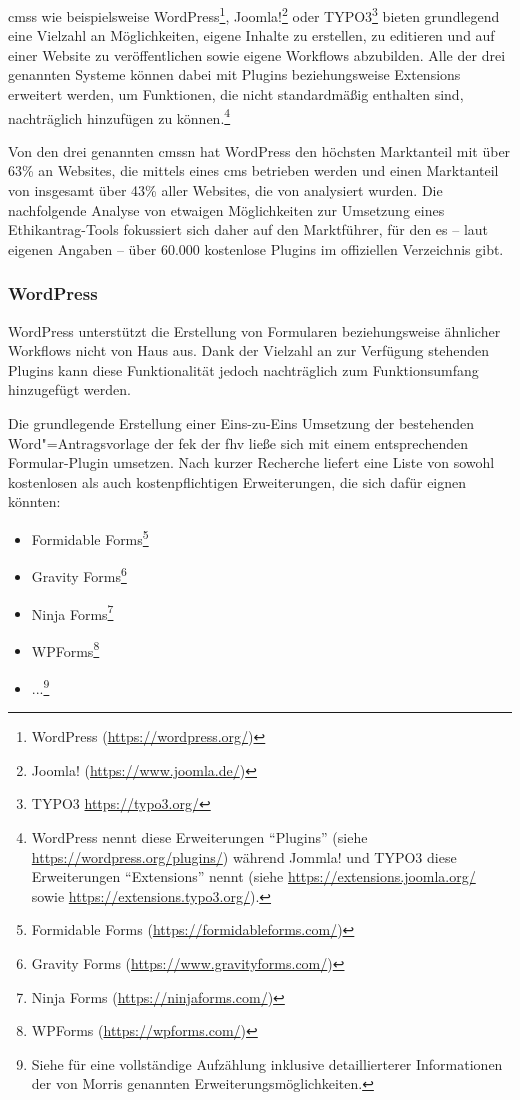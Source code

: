 \documentclass[a4paper,12pt,twoside]{scrreprt}
\begin{document}
\acp{cms} wie beispielsweise WordPress\footnote{WordPress (\url{https://wordpress.org/})}, Joomla!\footnote{Joomla! (\url{https://www.joomla.de/})} oder TYPO3\footnote{TYPO3 \url{https://typo3.org/}} bieten grundlegend eine Vielzahl an Möglichkeiten, eigene Inhalte zu erstellen, zu editieren und auf einer Website zu veröffentlichen sowie eigene Workflows abzubilden. \cite{oracle_corporation_who_2022} Alle der drei genannten Systeme können dabei mit Plugins beziehungsweise Extensions erweitert werden, um Funktionen, die nicht standardmäßig enthalten sind, nachträglich hinzufügen zu können.\footnote{WordPress nennt diese Erweiterungen \enquote{Plugins} (siehe \url{https://wordpress.org/plugins/}) während Jommla! und TYPO3 diese Erweiterungen \enquote{Extensions} nennt (siehe \url{https://extensions.joomla.org/} sowie \url{https://extensions.typo3.org/}).}

\medskip

Von den drei genannten \aclp{cms}n hat WordPress den höchsten Marktanteil mit über 63\% an Websites, die mittels eines \ac{cms} betrieben werden und einen Marktanteil von insgesamt über 43\% aller Websites, die von \cite{q-success_di_gelbmann_gmbh_usage_2023} analysiert wurden. Die nachfolgende Analyse von etwaigen Möglichkeiten zur Umsetzung eines Ethikantrag-Tools fokussiert sich daher auf den Marktführer, für den es -- laut eigenen Angaben \cite{wordpress_foundation_wordpress_2023} -- über 60.000 kostenlose Plugins im offiziellen Verzeichnis gibt.

\subsubsection*{WordPress}
\label{sub-sub-sec:wordpress}

WordPress unterstützt die Erstellung von Formularen beziehungsweise ähnlicher Workflows nicht von Haus aus. Dank der Vielzahl an zur Verfügung stehenden Plugins kann diese Funktionalität jedoch nachträglich zum Funktionsumfang hinzugefügt werden.

Die grundlegende Erstellung einer Eins-zu-Eins Umsetzung der bestehenden Word"=Antragsvorlage der \ac{fek} der \ac{fhv} ließe sich mit einem entsprechenden Formular-Plugin umsetzen. Nach kurzer Recherche liefert \cite{morris_8_2023} eine Liste von sowohl kostenlosen als auch kostenpflichtigen Erweiterungen, die sich dafür eignen könnten:
\begin{itemize}
    \item Formidable Forms\footnote{Formidable Forms (\url{https://formidableforms.com/})}
    \item Gravity Forms\footnote{Gravity Forms (\url{https://www.gravityforms.com/})}
    \item Ninja Forms\footnote{Ninja Forms (\url{https://ninjaforms.com/})}
    \item WPForms\footnote{WPForms (\url{https://wpforms.com/})}
    \item ...\footnote{Siehe \cite{morris_8_2023} für eine vollständige Aufzählung inklusive detaillierterer Informationen der von Morris genannten Erweiterungsmöglichkeiten.}
\end{itemize}
\end{document}
